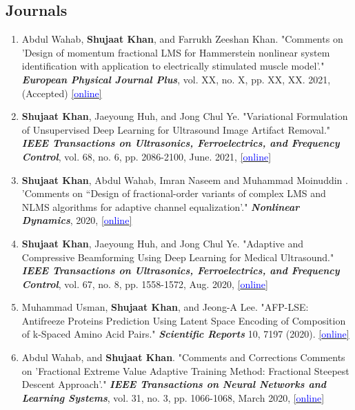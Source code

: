 \subsection*{Journals}
\begin{enumerate}
    \item Abdul Wahab, \textbf{Shujaat Khan}, and Farrukh Zeeshan Khan. "Comments on 'Design of momentum fractional LMS for Hammerstein nonlinear system identification with application to electrically stimulated muscle model'." \textit{\textbf{European Physical Journal Plus}}, vol. XX, no. X, pp. XX, XX. 2021, (Accepted) \href{https://arxiv.org/pdf/2009.07076.pdf}{[\textcolor{blue}{online}]}

    \item \textbf{Shujaat Khan}, Jaeyoung Huh, and Jong Chul Ye. "Variational Formulation of  Unsupervised Deep Learning for Ultrasound Image Artifact Removal." \textit{\textbf{IEEE Transactions on Ultrasonics, Ferroelectrics, and Frequency Control}}, vol. 68, no. 6, pp. 2086-2100, June. 2021, \href{https://doi.org/10.1109/tuffc.2021.3056197}{[\textcolor{blue}{online}]}

    \item \textbf{Shujaat Khan}, Abdul Wahab, Imran Naseem and Muhammad Moinuddin . 'Comments on “Design of fractional-order variants of complex LMS and NLMS algorithms for adaptive channel equalization'." \textit{\textbf{Nonlinear Dynamics}}, 2020, \href{https://doi.org/10.1007/s11071-020-05850-w}{[\textcolor{blue}{online}]}

    \item \textbf{Shujaat Khan}, Jaeyoung Huh, and Jong Chul Ye. "Adaptive and Compressive Beamforming Using Deep Learning for Medical Ultrasound." \textit{\textbf{IEEE Transactions on Ultrasonics, Ferroelectrics, and Frequency Control}}, vol. 67, no. 8, pp. 1558-1572, Aug. 2020, \href{https://doi.org/10.1109/TUFFC.2020.2977202}{[\textcolor{blue}{online}]}
 
    \item Muhammad Usman, \textbf{Shujaat Khan}, and Jeong-A Lee. "AFP-LSE: Antifreeze Proteins Prediction Using Latent Space Encoding of Composition of k-Spaced Amino Acid Pairs." \textit{\textbf{Scientific Reports}} 10, 7197 (2020). \href{https://doi.org/10.1038/s41598-020-63259-2}{[\textcolor{blue}{online}]}
    
   \item Abdul Wahab, and \textbf{Shujaat Khan}. "Comments and Corrections Comments on 'Fractional Extreme Value Adaptive Training Method: Fractional Steepest Descent Approach'." \textit{\textbf{IEEE Transactions on Neural Networks and Learning Systems}}, vol. 31, no. 3, pp. 1066-1068, March 2020, \href{https://doi.org/10.1109/TNNLS.2019.2899219}{[\textcolor{blue}{online}]} 
    

\end{enumerate}

